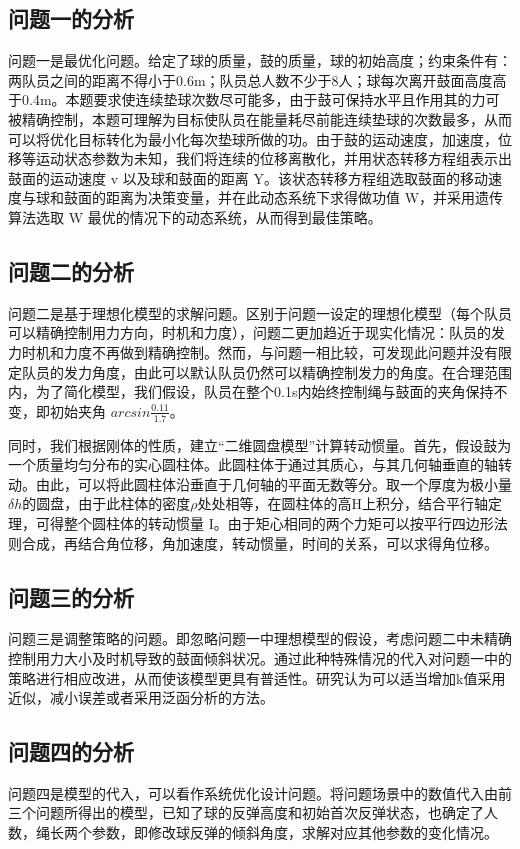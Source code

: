 \documentclass[withoutpreface,bwprint]{cumcmthesis}
\begin{document}
\subsection{问题一的分析}
问题一是最优化问题。给定了球的质量，鼓的质量，球的初始高度；约束条件有：两队员之间的距离不得小于0.6m；队员总人数不少于8人；球每次离开鼓面高度高于0.4m。本题要求使连续垫球次数尽可能多，由于鼓可保持水平且作用其的力可被精确控制，本题可理解为目标使队员在能量耗尽前能连续垫球的次数最多，从而可以将优化目标转化为最小化每次垫球所做的功。由于鼓的运动速度，加速度，位移等运动状态参数为未知，我们将连续的位移离散化，并用状态转移方程组表示出鼓面的运动速度 v 以及球和鼓面的距离 Y。该状态转移方程组选取鼓面的移动速度与球和鼓面的距离为决策变量，并在此动态系统下求得做功值 W，并采用遗传算法选取 W 最优的情况下的动态系统，从而得到最佳策略。
\subsection{问题二的分析}
问题二是基于理想化模型的求解问题。区别于问题一设定的理想化模型（每个队员可以精确控制用力方向，时机和力度），问题二更加趋近于现实化情况：队员的发力时机和力度不再做到精确控制。然而，与问题一相比较，可发现此问题并没有限定队员的发力角度，由此可以默认队员仍然可以精确控制发力的角度。在合理范围内，为了简化模型，我们假设，队员在整个0.1s内始终控制绳与鼓面的夹角保持不变，即初始夹角 $arcsin\frac{0.11}{1.7}$。

同时，我们根据刚体的性质，建立“二维圆盘模型”计算转动惯量。首先，假设鼓为一个质量均匀分布的实心圆柱体。此圆柱体于通过其质心，与其几何轴垂直的轴转动。由此，可以将此圆柱体沿垂直于几何轴的平面无数等分。取一个厚度为极小量$\delta h$的圆盘，由于此柱体的密度$\rho$处处相等，在圆柱体的高H上积分，结合平行轴定理，可得整个圆柱体的转动惯量 I。由于矩心相同的两个力矩可以按平行四边形法则合成，再结合角位移，角加速度，转动惯量，时间的关系，可以求得角位移。
\subsection{问题三的分析}
问题三是调整策略的问题。即忽略问题一中理想模型的假设，考虑问题二中未精确控制用力大小及时机导致的鼓面倾斜状况。通过此种特殊情况的代入对问题一中的策略进行相应改进，从而使该模型更具有普适性。研究认为可以适当增加k值采用近似，减小误差或者采用泛函分析的方法。
\subsection{问题四的分析}
问题四是模型的代入，可以看作系统优化设计问题。将问题场景中的数值代入由前三个问题所得出的模型，已知了球的反弹高度和初始首次反弹状态，也确定了人数，绳长两个参数，即修改球反弹的倾斜角度，求解对应其他参数的变化情况。
\end{document}
